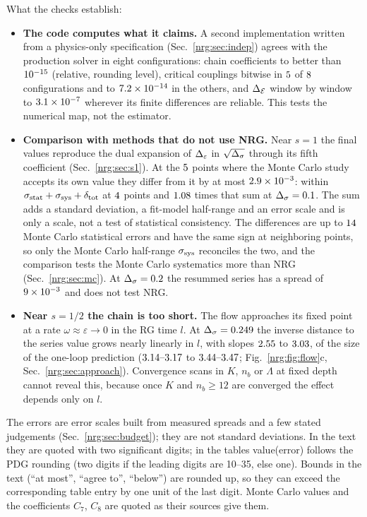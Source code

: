 What the checks establish:
\begin{itemize}
\item \textbf{The code computes what it claims.} A second implementation written from a physics-only specification
  (Sec.~\ref{nrg:sec:indep}) agrees with the production solver in eight configurations: chain coefficients to better than $10^{-15}$ (relative, rounding level),
  critical couplings bitwise in $5$ of $8$ configurations and to $7.2\times10^{-14}$ in the others, and $\Delta_{\mathcal E}$
  window by window to $3.1\times10^{-7}$ wherever its finite differences are reliable. This tests the numerical map, not the estimator.
\item \textbf{Comparison with methods that do not use NRG.} Near $s=1$ the final values reproduce the dual expansion of $\Delta_\varepsilon$ in
  $\sqrt{\Delta_\sigma}$ through its fifth coefficient (Sec.~\ref{nrg:sec:s1}). At the $5$ points where the Monte Carlo study accepts its
  own value they differ from it by at most $2.9\times10^{-3}$: within $\sigma_{\rm stat}+\sigma_{\rm sys}+\delta_{\rm tot}$ at
  $4$ points and $1.08$ times that sum at $\Delta_\sigma=0.1$. The sum adds a standard deviation, a
  fit-model half-range and an error scale and is only a scale, not a test of statistical consistency. The differences are up to
  $14$ Monte Carlo statistical errors and have the same sign at neighboring points, so only the Monte Carlo
  half-range $\sigma_{\rm sys}$ reconciles the two, and the comparison tests the Monte Carlo systematics more than NRG
  (Sec.~\ref{nrg:sec:mc}). At $\Delta_\sigma=0.2$ the resummed series has a spread of $9\times10^{-3}$ and does not test NRG.
\item \textbf{Near $s=1/2$ the chain is too short.} The flow approaches its fixed point at a rate $\omega\approx\varepsilon\to0$ in
  the RG time $l$. At $\Delta_\sigma=0.249$ the inverse distance to the series value grows nearly linearly in $l$, with slopes $2.55$
  to $3.03$, of the size of the one-loop prediction ($3.14\text{--}3.17$ to $3.44\text{--}3.47$; Fig.~\ref{nrg:fig:flow}c,
  Sec.~\ref{nrg:sec:approach}). Convergence scans in $K$, $n_b$ or $\Lambda$ at fixed depth cannot reveal this, because once $K$ and
  $n_b\ge12$ are converged the effect depends only on $l$.
\end{itemize}
The errors are error scales built from measured spreads and a few stated judgements (Sec.~\ref{nrg:sec:budget}); they are not standard
deviations. In the text they are quoted with two significant digits; in the tables value(error) follows the PDG rounding (two digits
if the leading digits are 10--35, else one). Bounds in the text (``at most'', ``agree to'', ``below'') are rounded up, so they can
exceed the corresponding table entry by one unit of the last digit. Monte Carlo values and the coefficients $C_7$, $C_8$ are quoted
as their sources give them.

